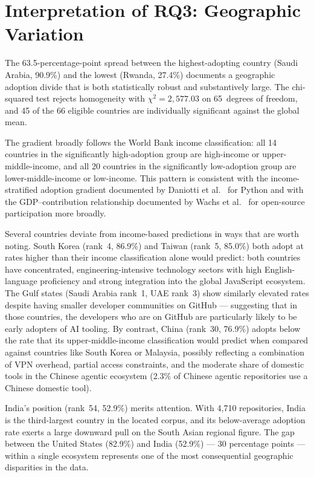 \section{Interpretation of RQ3: Geographic Variation}
\label{sec:disc:rq3}

The 63.5-percentage-point spread between the highest-adopting country (Saudi Arabia, 90.9\%) and the lowest (Rwanda, 27.4\%) documents a geographic adoption divide that is both statistically robust and substantively large. The chi-squared test rejects homogeneity with $\chi^2 = 2{,}577.03$ on 65~degrees of freedom, and 45 of the 66 eligible countries are individually significant against the global mean.

The gradient broadly follows the World Bank income classification: all 14 countries in the significantly high-adoption group are high-income or upper-middle-income, and all 20 countries in the significantly low-adoption group are lower-middle-income or low-income. This pattern is consistent with the income-stratified adoption gradient documented by Daniotti et al.~\cite{daniotti2025} for Python and with the GDP--contribution relationship documented by Wachs et al.~\cite{wachs2022} for open-source participation more broadly.

Several countries deviate from income-based predictions in ways that are worth noting. South Korea (rank~4, 86.9\%) and Taiwan (rank~5, 85.0\%) both adopt at rates higher than their income classification alone would predict: both countries have concentrated, engineering-intensive technology sectors with high English-language proficiency and strong integration into the global JavaScript ecosystem. The Gulf states (Saudi Arabia rank~1, UAE rank~3) show similarly elevated rates despite having smaller developer communities on GitHub --- suggesting that in those countries, the developers who are on GitHub are particularly likely to be early adopters of AI tooling. By contrast, China (rank~30, 76.9\%) adopts below the rate that its upper-middle-income classification would predict when compared against countries like South Korea or Malaysia, possibly reflecting a combination of VPN overhead, partial access constraints, and the moderate share of domestic tools in the Chinese agentic ecosystem (2.3\% of Chinese agentic repositories use a Chinese domestic tool).

India's position (rank~54, 52.9\%) merits attention. With 4,710 repositories, India is the third-largest country in the located corpus, and its below-average adoption rate exerts a large downward pull on the South Asian regional figure. The gap between the United States (82.9\%) and India (52.9\%) --- 30 percentage points --- within a single ecosystem represents one of the most consequential geographic disparities in the data.

